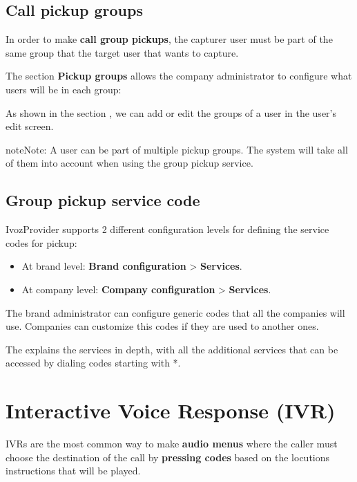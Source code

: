 \documentclass[letterpaper,10pt,english]{sphinxmanual}
\begin{document}
\subsection{Call pickup groups}
\label{company/call_captures:call-pickup-groups}
In order to make \textbf{call group pickups}, the capturer user must be part of the
same group that the target user that wants to capture.

The section \textbf{Pickup groups} allows the company administrator to configure
what users will be in each group:

\noindent{}

As shown in the section {\hyperref[company/users:users]{}}, we can add or edit the groups of a user
in the user's edit screen.

\begin{notice}{note}{Note:}
A user can be part of multiple pickup groups. The system will take
all of them into account when using the group pickup service.
\end{notice}


\subsection{Group pickup service code}
\label{company/call_captures:group-pickup-service-code}
IvozProvider supports 2 different configuration levels for defining the service
codes for pickup:
\begin{itemize}
\item {} 
At brand level: \textbf{Brand configuration} \textgreater{} \textbf{Services}.

\item {} 
At company level: \textbf{Company configuration} \textgreater{} \textbf{Services}.

\end{itemize}

The brand administrator can configure generic codes that all the companies will
use. Companies can customize this codes if they are used to another ones.

The {\hyperref[platform/services:services]{}} explains the services in depth, with
all the additional services that can be accessed by dialing codes starting with
*.


\section{Interactive Voice Response (IVR)}
\label{company/ivrs::doc}\label{company/ivrs:interactive-voice-response-ivr}
IVRs are the most common way to make \textbf{audio menus} where the caller must
choose the destination of the call by \textbf{pressing codes} based on the locutions
instructions that will be played.
\end{document}
